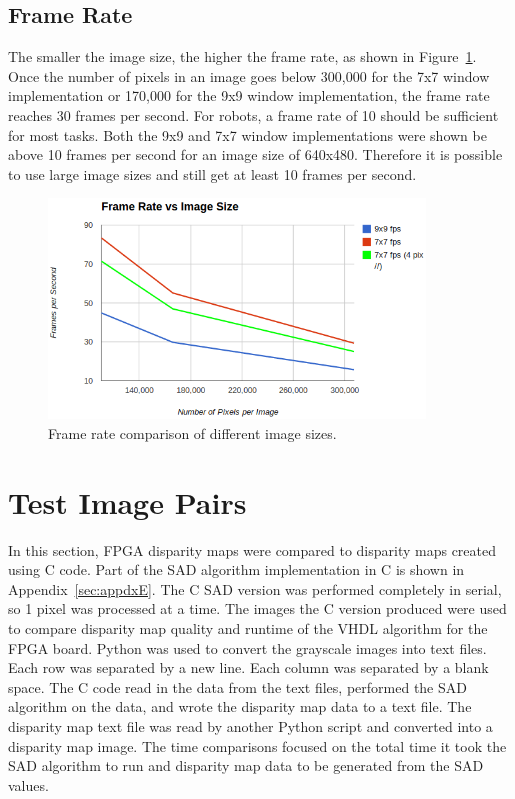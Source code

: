 \subsection{Frame Rate}
\label{sec:frameRate}

The smaller the image size, the higher the frame rate, as shown in Figure~\ref{fig:frameRate}. Once the number of pixels in an image goes below 300,000 for the 7x7 window implementation or 170,000 for the 9x9 window implementation, the frame rate reaches 30 frames per second. For robots, a frame rate of 10 should be sufficient for most tasks. Both the 9x9 and 7x7 window implementations were shown be above 10 frames per second for an image size of 640x480. Therefore it is possible to use large image sizes and still get at least 10 frames per second.

\begin{figure}[h]
	\begin{center}
		\includegraphics[width=100mm]{figures/frameRate.png}
		\captionfonts
		\caption{Frame rate comparison of different image sizes.}
		\label{fig:frameRate}
	\end{center}
\end{figure}

\section{Test Image Pairs}
\label{sec:runtime}

In this section, FPGA disparity maps were compared to disparity maps created using C code. Part of the SAD algorithm implementation in C is shown in Appendix~\ref{sec:appdxE}. The C SAD version was performed completely in serial, so 1 pixel was processed at a time. The images the C version produced were used to compare disparity map quality and runtime of the VHDL algorithm for the FPGA board. Python was used to convert the grayscale images into text files. Each row was separated by a new line. Each column was separated by a blank space. The C code read in the data from the text files, performed the SAD algorithm on the data, and wrote the disparity map data to a text file. The disparity map text file was read by another Python script and converted into a disparity map image. The time comparisons focused on the total time it took the SAD algorithm to run and disparity map data to be generated from the SAD values.

